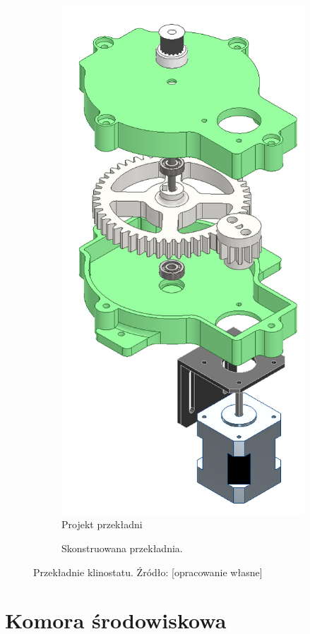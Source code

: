 \begin{figure}
	\centering
	
	\begin{subfigure}[h]{.49\textwidth}
		\centering
		\includegraphics[width=.4\textwidth]{przekladnia_projekt_exploded_shaded}
		\caption{Projekt przekładni} 
		\label{fig:projekt przekładni}
	\end{subfigure}
	\hfill%
	\begin{subfigure}[h]{.49\textwidth}
		\centering
		\setlength{\fboxsep}{0pt}
		\setlength{\fboxrule}{1pt}
		\caption{Skonstruowana przekładnia.} 
		\label{fig:gotowa przekładnia}
	\end{subfigure}

	\caption{Przekładnie klinostatu. Źródło: [opracowanie własne]}
	
\end{figure}

\section{Komora środowiskowa}

